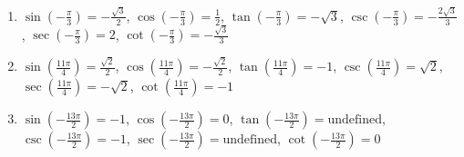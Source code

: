 \begin{enumerate}
    \item $\sin\left(-\frac{\pi}{3}\right) = -\frac{\sqrt{3}}{2}$, 
        $\cos\left(-\frac{\pi}{3}\right) = \frac{1}{2}$, 
        $\tan\left(-\frac{\pi}{3}\right) = -\sqrt{3}$, 
        $\csc\left(-\frac{\pi}{3}\right) = -\frac{2\sqrt{3}}{3}$, 
        $\sec\left(-\frac{\pi}{3}\right) = 2$, 
        $\cot\left(-\frac{\pi}{3}\right) = -\frac{\sqrt{3}}{3}$
        
    \item $\sin\left(\frac{11\pi}{4}\right) = \frac{\sqrt{2}}{2}$, 
        $\cos\left(\frac{11\pi}{4}\right) = -\frac{\sqrt{2}}{2}$, 
        $\tan\left(\frac{11\pi}{4}\right) = -1$, 
        $\csc\left(\frac{11\pi}{4}\right) = \sqrt{2}$, 
        $\sec\left(\frac{11\pi}{4}\right) = -\sqrt{2}$, 
        $\cot\left(\frac{11\pi}{4}\right) = -1$
        
    \item $\sin\left(-\frac{13\pi}{2}\right) = -1$, 
        $\cos\left(-\frac{13\pi}{2}\right) = 0$, 
        $\tan\left(-\frac{13\pi}{2}\right) = \text{undefined}$, 
        $\csc\left(-\frac{13\pi}{2}\right) = -1$, 
        $\sec\left(-\frac{13\pi}{2}\right) = \text{undefined}$, 
        $\cot\left(-\frac{13\pi}{2}\right) = 0$
    
    
\end{enumerate}
